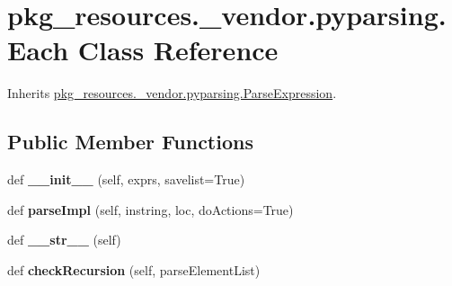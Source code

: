 \hypertarget{classpkg__resources_1_1__vendor_1_1pyparsing_1_1_each}{}\section{pkg\+\_\+resources.\+\_\+vendor.\+pyparsing.\+Each Class Reference}
\label{classpkg__resources_1_1__vendor_1_1pyparsing_1_1_each}


Inherits \hyperlink{classpkg__resources_1_1__vendor_1_1pyparsing_1_1_parse_expression}{pkg\+\_\+resources.\+\_\+vendor.\+pyparsing.\+Parse\+Expression}.

\subsection*{Public Member Functions}
\begin{DoxyCompactItemize}
\item 
\mbox{\label{classpkg__resources_1_1__vendor_1_1pyparsing_1_1_each_a646bcb9698b865ddc39c2154584d04ef}} 
def {\bfseries \+\_\+\+\_\+init\+\_\+\+\_\+} (self, exprs, savelist=True)
\item 
\mbox{\label{classpkg__resources_1_1__vendor_1_1pyparsing_1_1_each_a0277c6df01ea0101941a2ee9acaf3175}} 
def {\bfseries parse\+Impl} (self, instring, loc, do\+Actions=True)
\item 
\mbox{\label{classpkg__resources_1_1__vendor_1_1pyparsing_1_1_each_af494063906a9245aedc8a5f8fa5a434d}} 
def {\bfseries \+\_\+\+\_\+str\+\_\+\+\_\+} (self)
\item 
\mbox{\label{classpkg__resources_1_1__vendor_1_1pyparsing_1_1_each_a81a5097b601ac0ab5fe3a8b39532625e}} 
def {\bfseries check\+Recursion} (self, parse\+Element\+List)
\end{DoxyCompactItemize}
